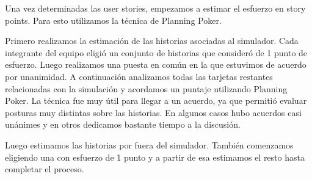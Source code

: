 Una vez determinadas las user stories, empezamos a estimar el esfuerzo en story points. Para esto utilizamos la técnica de Planning Poker.

Primero realizamos la estimación de las historias asociadas al simulador. Cada integrante del equipo eligió un conjunto de historias 
que consideró de 1 punto de esfuerzo. Luego realizamos una puesta en común en la que estuvimos de acuerdo por unanimidad. A continuación
analizamos todas las tarjetas restantes relacionadas con la simulación y acordamos un puntaje utilizando Planning Poker. La técnica
fue muy útil para llegar a un acuerdo, ya que permitió evaluar posturas muy distintas sobre las historias. En algunos casos hubo acuerdos casi
unánimes y en otros dedicamos bastante tiempo a la discusi\'on.

Luego estimamos las historias por fuera del simulador. También comenzamos eligiendo una con esfuerzo de 1 punto y a partir de esa estimamos
el resto hasta completar el proceso.
